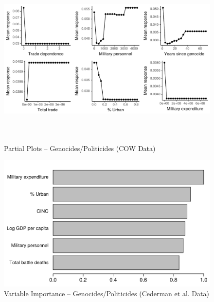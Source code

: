 \documentclass[a4paper,12pt]{article}
\begin{document}
\begin{figure}[H]
    \centering
    \includegraphics[width=\textwidth, height=9cm]{images/drfdpp6a.pdf}
    \caption{Partial Plots -- Genocides/Politicides (COW Data)}
    \label{fig:my_label}
\end{figure}

\begin{figure}[H]
    \centering
    \includegraphics{images/drf-gp3.pdf}
    \caption{Variable Importance -- Genocides/Politicides (Cederman et al. Data)}
    \label{fig:my_label}
\end{figure}
\end{document}
